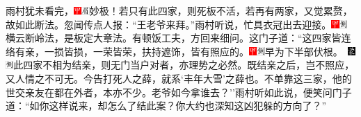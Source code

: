 雨村犹未看完，{\includegraphics[width=3mm]{../Images/00002}\includegraphics[width=3mm]{../Images/00010}\footnotesize \kaishu 妙极！若只有此四家，则死板不活，若再有两家，又觉累赘，故如此断法。}忽闻传点人报：``王老爷来拜。''雨村听说，忙具衣冠出去迎接。{\includegraphics[width=3mm]{../Images/00002}\includegraphics[width=3mm]{../Images/00011}\footnotesize \kaishu 横云断岭法，是板定大章法。}有顿饭工夫，方回来细问。这门子道：``这四家皆连络有亲，一损皆损，一荣皆荣，扶持遮饰，皆有照应的。{{\includegraphics[width=3mm]{../Images/00002}\includegraphics[width=3mm]{../Images/00011}\footnotesize \kaishu 早为下半部伏根。　}\includegraphics[width=3mm]{../Images/00006}\includegraphics[width=3mm]{../Images/00011}\footnotesize \kaishu 此四家不相为结亲，则无门当户对者，亦理势之必然。既结亲之后，岂不照应，又人情之不可无。}今告打死人之薛，就系`丰年大雪'之薛也。不单靠这三家，他的世交亲友在都在外者，本亦不少。老爷如今拿谁去？''雨村听如此说，便笑问门子道：``如你这样说来，却怎么了结此案？你大约也深知这凶犯躲的方向了？''

